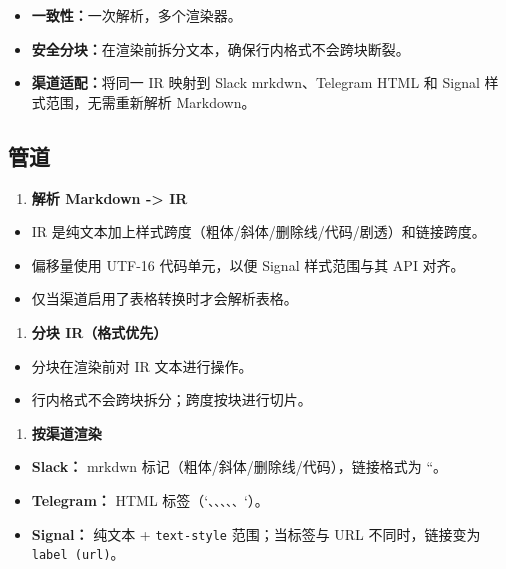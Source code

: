 \begin{itemize}
  \item \textbf{一致性：}一次解析，多个渲染器。
  \item \textbf{安全分块：}在渲染前拆分文本，确保行内格式不会跨块断裂。
  \item \textbf{渠道适配：}将同一 IR 映射到 Slack mrkdwn、Telegram HTML 和 Signal 样式范围，无需重新解析 Markdown。
\end{itemize}


\subsection{管道}


\begin{enumerate}
  \item \textbf{解析 Markdown -> IR}
\end{enumerate}

\begin{itemize}
  \item IR 是纯文本加上样式跨度（粗体/斜体/删除线/代码/剧透）和链接跨度。
  \item 偏移量使用 UTF-16 代码单元，以便 Signal 样式范围与其 API 对齐。
  \item 仅当渠道启用了表格转换时才会解析表格。
\end{itemize}

\begin{enumerate}
  \item \textbf{分块 IR（格式优先）}
\end{enumerate}

\begin{itemize}
  \item 分块在渲染前对 IR 文本进行操作。
  \item 行内格式不会跨块拆分；跨度按块进行切片。
\end{itemize}

\begin{enumerate}
  \item \textbf{按渠道渲染}
\end{enumerate}

\begin{itemize}
  \item \textbf{Slack：} mrkdwn 标记（粗体/斜体/删除线/代码），链接格式为 ``。
  \item \textbf{Telegram：} HTML 标签（`\texttt{、}\texttt{、}\texttt{、}\texttt{、}\texttt{、}`）。
  \item \textbf{Signal：} 纯文本 + \texttt{text-style} 范围；当标签与 URL 不同时，链接变为 \texttt{label (url)}。
\end{itemize}


